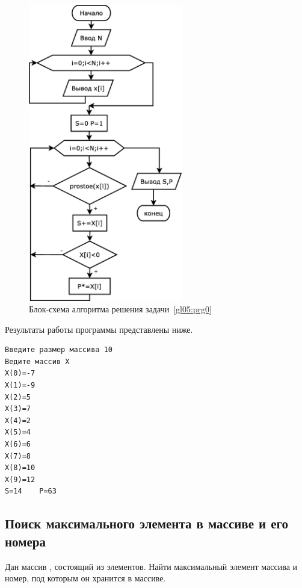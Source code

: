 \begin{figure}[htb]
\begin{center}
\includegraphics[width=0.6\textwidth]{img/ris_5_6}
\caption{Блок-схема алгоритма решения задачи~\ref{gl05:prg0}}
\label{ch05:refDrawing5}
\end{center}
\end{figure}

Результаты работы программы представлены ниже.
\begin{verbatim}
Введите размер массива 10 
Ведите массив Х 
X(0)=-7 
X(1)=-9 
X(2)=5 
X(3)=7 
X(4)=2 
X(5)=4 
X(6)=6 
X(7)=8 
X(8)=10 
X(9)=12 
S=14	P=63 
\end{verbatim}

\subsection[Поиск максимального элемента в массиве и его номера]{Поиск максимального элемента в массиве и его номера}
Дан массив , состоящий из  элементов. Найти максимальный элемент массива и номер, под которым он хранится в массиве. 

